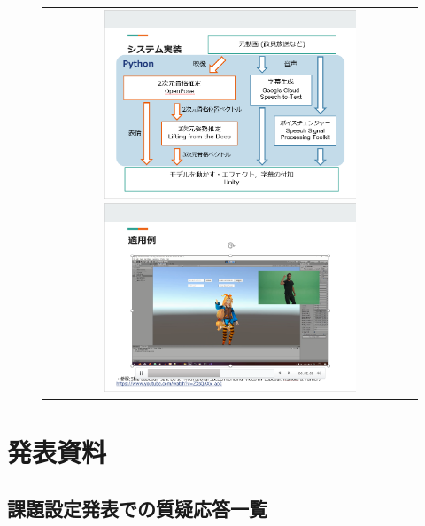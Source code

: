 \documentclass[a4paper,12pt]{jsarticle}
\begin{document}
\begin{figure}[H]
	\begin{center}
		\begin{tabular}{c}
			\begin{minipage}{0.50\hsize}
				\centering
				\includegraphics[width=7.5cm]{./fig/slide1.png}
			\end{minipage}

			\begin{minipage}{0.50\hsize}
				\centering
				\includegraphics[width=7.5cm]{./fig/slide2.png}
			\end{minipage}
		\end{tabular}
	\end{center}
\end{figure}


\setcounter{section}{4}

\section{発表資料}

\subsection{課題設定発表での質疑応答一覧}
\end{document}

